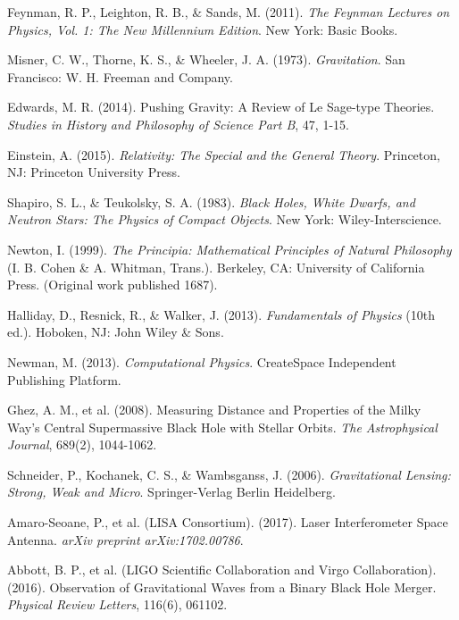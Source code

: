 \documentclass[pdflatex,sn-mathphys-num]{sn-jnl}
\begin{document}
\begin{thebibliography}{99}
Feynman, R. P., Leighton, R. B., \& Sands, M. (2011). \textit{The Feynman Lectures on Physics, Vol. 1: The New Millennium Edition}. New York: Basic Books.

Misner, C. W., Thorne, K. S., \& Wheeler, J. A. (1973). \textit{Gravitation}. San Francisco: W. H. Freeman and Company.

Edwards, M. R. (2014). Pushing Gravity: A Review of Le Sage-type Theories. \textit{Studies in History and Philosophy of Science Part B}, 47, 1-15.

Einstein, A. (2015). \textit{Relativity: The Special and the General Theory}. Princeton, NJ: Princeton University Press.

Shapiro, S. L., \& Teukolsky, S. A. (1983). \textit{Black Holes, White Dwarfs, and Neutron Stars: The Physics of Compact Objects}. New York: Wiley-Interscience.

Newton, I. (1999). \textit{The Principia: Mathematical Principles of Natural Philosophy} (I. B. Cohen \& A. Whitman, Trans.). Berkeley, CA: University of California Press. (Original work published 1687).

Halliday, D., Resnick, R., \& Walker, J. (2013). \textit{Fundamentals of Physics} (10th ed.). Hoboken, NJ: John Wiley \& Sons.

Newman, M. (2013). \textit{Computational Physics}. CreateSpace Independent Publishing Platform.

Ghez, A. M., et al. (2008). Measuring Distance and Properties of the Milky Way's Central Supermassive Black Hole with Stellar Orbits. \textit{The Astrophysical Journal}, 689(2), 1044-1062.

Schneider, P., Kochanek, C. S., \& Wambsganss, J. (2006). \textit{Gravitational Lensing: Strong, Weak and Micro}. Springer-Verlag Berlin Heidelberg.

Amaro-Seoane, P., et al. (LISA Consortium). (2017). Laser Interferometer Space Antenna. \textit{arXiv preprint arXiv:1702.00786}.

Abbott, B. P., et al. (LIGO Scientific Collaboration and Virgo Collaboration). (2016). Observation of Gravitational Waves from a Binary Black Hole Merger. \textit{Physical Review Letters}, 116(6), 061102.


\end{thebibliography}
\end{document}
